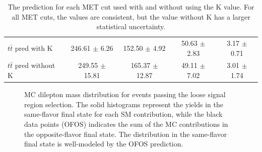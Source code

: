 \begin{table}[hbt]
  \begin{center}
	\caption{
	  \label{tab:ttbpredk}
	  The \ttbar prediction for each MET cut used with and without using the K value. 
	  For all MET cuts, the values are consistent, but the value without K 
	  has a larger statistical uncertainty.
	}
	\begin{tabular}{lcccc}
	  \hline
	  \resulttitle
\hline
$t\bar{t}$ pred with K    &  246.61  $\pm$  6.26  &  152.50  $\pm$  4.92  &  50.63  $\pm$  2.83  &  3.17  $\pm$  0.71  \\
$t\bar{t}$ pred without K &  249.55  $\pm$  15.81  &  165.37  $\pm$  12.87  &  49.11  $\pm$  7.02  &  3.01  $\pm$  1.74  \\


\hline
	\end{tabular}
  \end{center}
\end{table}


\begin{figure}[hbt]
  \begin{center}
    \caption{MC dilepton mass distribution for events passing the loose signal region selection. 
	  The solid histograms represent the yields in the same-flavor
      final state for each SM contribution, while the black data points (OFOS) indicates the 
	  sum of the \ttbar MC contributions in the opposite-flavor final state.
      The \ttbar distribution in the same-flavor final state is well-modeled by the OFOS prediction.}
    \label{fig:ttbar}
  \end{center}
\end{figure}

